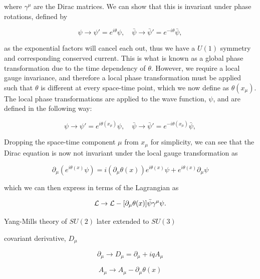 where $\gamma^{\mu}$ are the Dirac matrices. We can show that this is invariant under phase rotations, defined by

\begin{equation}
\psi \to \psi'= e^{i \theta}\psi, \quad \bar{\psi} \to \bar{\psi}' = e^{- i \theta}\bar{\psi},
\end{equation}

as the exponential factors will cancel each out, thus we have a $U(1)$ symmetry and corresponding conserved current. This is what is known as a global phase transformation due to the time dependency of $\theta$. However, we require a local gauge invariance, and therefore a local phase transformation must be applied such that $\theta$ is different at every space-time point, which we now define as $\theta (x_{\mu})$. The local phase transformations are applied to the wave function, $\psi$, and are defined in the following way:

\begin{equation}
\psi \to \psi'= e^{i \theta(x_{\mu})}\psi, \quad \bar{\psi} \to \bar{\psi}' = e^{- i \theta(x_{\mu})}\bar{\psi},
\end{equation} 

Dropping the space-time component $\mu$ from $x_{\mu}$ for simplicity, we can see that the Dirac equation is now not invariant under the local gauge transformation as

\begin{equation}
\partial_{\mu} (e^{i\theta(x)}\psi) = i(\partial_{\mu}\theta(x))e^{i\theta(x)}\psi + e^{i\theta(x)} \partial_{\mu}\psi 
\end{equation}

which we can then express in terms of the Lagrangian as

\begin{equation}
\mathcal{L} \to \mathcal{L} - [\partial_{\mu} \theta(x)] \bar{\psi} \gamma^{\mu} \psi.
\end{equation}

Yang-Mills theory of $SU(2)$ later extended to $SU(3)$ \cite{PhysRev.96.191}



covariant derivative, $D_{\mu}$

\begin{equation}
\partial_{\mu} \to D_{\mu} = \partial_{\mu} + iqA_{\mu}
\end{equation}

\begin{equation}
A_{\mu} \to A_{\mu} - \partial_{\mu} \theta(x)
\end{equation}

